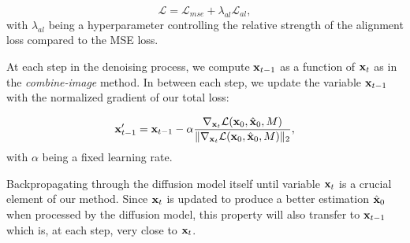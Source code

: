 \begin{equation}
\mathcal{L} = \mathcal{L}_{mse} + \lambda_{al} \mathcal{L}_{al},
\end{equation}
with $\lambda_{al}$ being a hyperparameter controlling the relative strength of the alignment loss compared to the MSE loss.





At each step in the denoising process, we compute $\mathbf{x}_{t-1}$ as a function of $\mathbf{x}_t$ as in the \textit{combine-image} method. In between each step, we update the variable $\mathbf{x}_{t-1}$ with the normalized gradient of our total loss:

\begin{equation}
\mathbf{x}_{t-1}' = \mathbf{x}_{t-1} - \alpha \frac{\nabla_{\mathbf{x}_t}\mathcal{L}(\mathbf{x}_0, \hat{\mathbf{x}}_0, M)}{\Vert \nabla_{\mathbf{x}_t}\mathcal{L}(\mathbf{x}_0, \hat{\mathbf{x}}_0, M) \Vert_2},
\end{equation}
with $\alpha$ being a fixed learning rate.



Backpropagating through the diffusion model itself until variable $\mathbf{x}_t$ is a crucial element of our method. Since $\mathbf{x}_t$ is 
updated to produce a better estimation $\hat{\mathbf{x}}_0$
 when processed by the diffusion model, this property will also transfer to $\mathbf{x}_{t-1}$ which is, at each step, very 
 close to $\mathbf{x}_t$.






